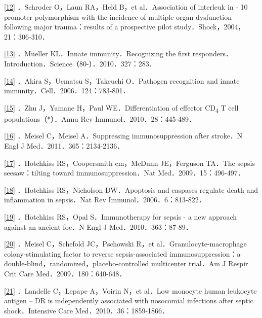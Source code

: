 \protect\hyperlink{text00007.htmlux5cux23ch12-6-back}{{[}12{]}}
．Schroder O，Laun RA，Held B，et al．Association of interleuk in - 10
promoter polymorphism with the incidence of multiple organ dysfunction
following major trauma：results of a prospective pilot
study．Shock，2004，21：306-310．

\protect\hyperlink{text00007.htmlux5cux23ch13-6-back}{{[}13{]}}
．Mueller KL．Innate immunity．Recognizing the first
responders．Introduction．Science（80-）．2010．327：283．

\protect\hyperlink{text00007.htmlux5cux23ch14-6-back}{{[}14{]}} ．Akira
S，Uematsu S，Takeuchi O．Pathogen recognition and innate
immunity．Cell．2006．124：783-801．

\protect\hyperlink{text00007.htmlux5cux23ch15-6-back}{{[}15{]}} ．Zhu
J，Yamane H，Paul WE．Differentiation of effector CD\textsubscript{4} T
cell populations（*）．Annu Rev Immunol．2010．28：445-489．

\protect\hyperlink{text00007.htmlux5cux23ch16-6-back}{{[}16{]}} ．Meisel
C，Meisel A．Suppressing immunosuppression after stroke．N Engl J
Med．2011．365：2134-2136．

\protect\hyperlink{text00007.htmlux5cux23ch17-6-back}{{[}17{]}}
．Hotchkiss RS，Coopersmith cm，McDunn JE，Ferguson TA．The sepsis
seesaw：tilting toward immunosuppression．Nat Med．2009．15：496-497．

\protect\hyperlink{text00007.htmlux5cux23ch18-6-back}{{[}18{]}}
．Hotchkiss RS，Nicholson DW．Apoptosis and caspases regulate death and
inflammation in sepsis．Nat Rev Immunol．2006．6：813-822．

\protect\hyperlink{text00007.htmlux5cux23ch19-6-back}{{[}19{]}}
．Hotchkiss RS，Opal S．Immunotherapy for sepsis - a new approach
against an ancient foe．N Engl J Med．2010．363：87-89．

\protect\hyperlink{text00007.htmlux5cux23ch20-6-back}{{[}20{]}} ．Meisel
C，Schefold JC，Pschowski R，et al．Granulocyte-macrophage
colony-stimulating factor to reverse sepsis-associated
immunosuppression：a double-blind，randomized，placebo-controlled
multicenter trial．Am J Respir Crit Care Med．2009．180：640-648．

\protect\hyperlink{text00007.htmlux5cux23ch21-6-back}{{[}21{]}}
．Landelle C，Lepape A，Voirin N，et al．Low monocyte human leukocyte
antigen -- DR is independently associated with nosocomial infections
after septic shock．Intensive Care Med．2010．36：1859-1866．

\protect\hypertarget{text00008.html}{}{}


